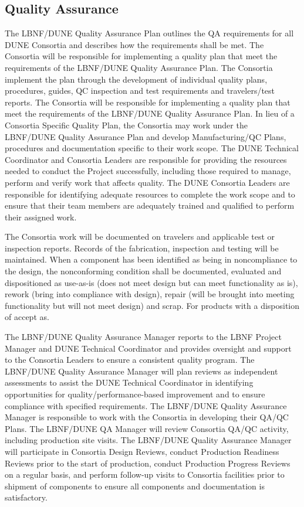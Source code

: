 \subsection{Quality Assurance}
\label{sec:fdsp-coord-qa}


The LBNF/DUNE Quality Assurance Plan outlines the QA requirements for
all DUNE Consortia and describes how the requirements shall be
met. The Consortia will be responsible for implementing a quality plan
that meet the requirements of the LBNF/DUNE Quality Assurance Plan.
The Consortia implement the plan through the development of individual
quality plans, procedures, guides, QC inspection and test requirements
and travelers/test reports.  The Consortia will be responsible for
implementing a quality plan that meet the requirements of the
LBNF/DUNE Quality Assurance Plan. In lieu of a Consortia Specific
Quality Plan, the Consortia may work under the LBNF/DUNE Quality
Assurance Plan and develop Manufacturing/QC Plans, procedures and
documentation specific to their work scope.  The DUNE Technical
Coordinator and Consortia Leaders are responsible for providing the
resources needed to conduct the Project successfully, including those
required to manage, perform and verify work that affects quality.  The
DUNE Consortia Leaders are responsible for identifying adequate
resources to complete the work scope and to ensure that their team
members are adequately trained and qualified to perform their assigned
work.

The Consortia work will be documented on travelers and applicable test
or inspection reports. Records of the fabrication, inspection and
testing will be maintained. When a component has been identified as
being in noncompliance to the design, the nonconforming condition
shall be documented, evaluated and dispositioned as use-as-is (does
not meet design but can meet functionality as is), rework (bring into
compliance with design), repair (will be brought into meeting
functionality but will not meet design) and scrap. For products with a
disposition of accept as.

The LBNF/DUNE Quality Assurance Manager reports to the LBNF Project
Manager and DUNE Technical Coordinator and provides oversight and
support to the Consortia Leaders to ensure a consistent quality
program. The LBNF/DUNE Quality Assurance Manager will plan reviews as
independent assessments to assist the DUNE Technical Coordinator in
identifying opportunities for quality/performance-based improvement
and to ensure compliance with specified requirements. The LBNF/DUNE
Quality Assurance Manager is responsible to work with the Consortia in
developing their QA/QC Plans. The LBNF/DUNE QA Manager will review
Consortia QA/QC activity, including production site visits.  The
LBNF/DUNE Quality Assurance Manager will participate in Consortia
Design Reviews, conduct Production Readiness Reviews prior to the
start of production, conduct Production Progress Reviews on a regular
basis, and perform follow-up visits to Consortia facilities prior to
shipment of components to ensure all components and documentation is
satisfactory.


